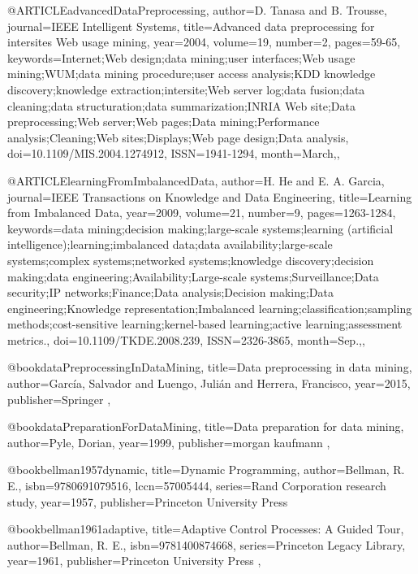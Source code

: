 @ARTICLE{advancedDataPreprocessing, 
author={D. {Tanasa} and B. {Trousse}}, 
journal={IEEE Intelligent Systems}, 
title={Advanced data preprocessing for intersites Web usage mining}, 
year={2004}, 
volume={19}, 
number={2}, 
pages={59-65}, 
keywords={Internet;Web design;data mining;user interfaces;Web usage mining;WUM;data mining procedure;user access analysis;KDD knowledge discovery;knowledge extraction;intersite;Web server log;data fusion;data cleaning;data structuration;data summarization;INRIA Web site;Data preprocessing;Web server;Web pages;Data mining;Performance analysis;Cleaning;Web sites;Displays;Web page design;Data analysis}, 
doi={10.1109/MIS.2004.1274912}, 
ISSN={1941-1294}, 
month={March},},

@ARTICLE{learningFromImbalancedData, 
author={H. {He} and E. A. {Garcia}}, 
journal={IEEE Transactions on Knowledge and Data Engineering}, 
title={Learning from Imbalanced Data}, 
year={2009}, 
volume={21}, 
number={9}, 
pages={1263-1284}, 
keywords={data mining;decision making;large-scale systems;learning (artificial intelligence);learning;imbalanced data;data availability;large-scale systems;complex systems;networked systems;knowledge discovery;decision making;data engineering;Availability;Large-scale systems;Surveillance;Data security;IP networks;Finance;Data analysis;Decision making;Data engineering;Knowledge representation;Imbalanced learning;classification;sampling methods;cost-sensitive learning;kernel-based learning;active learning;assessment metrics.}, 
doi={10.1109/TKDE.2008.239}, 
ISSN={2326-3865}, 
month={Sep.},},

@book{dataPreprocessingInDataMining,
  title={Data preprocessing in data mining},
  author={García, Salvador and Luengo, Julián and Herrera, Francisco},
  year={2015},
  publisher={Springer}
},

@book{dataPreparationForDataMining,
  title={Data preparation for data mining},
  author={Pyle, Dorian},
  year={1999},
  publisher={morgan kaufmann}
},

@book{bellman1957dynamic,
  title={Dynamic Programming},
  author={Bellman, R. E.},
  isbn={9780691079516},
  lccn={57005444},
  series={Rand Corporation research study},
  year={1957},
  publisher={Princeton University Press}
}

@book{bellman1961adaptive,
  title={Adaptive Control Processes: A Guided Tour},
  author={Bellman, R. E.},
  isbn={9781400874668},
  series={Princeton Legacy Library},
  year={1961},
  publisher={Princeton University Press}
},

